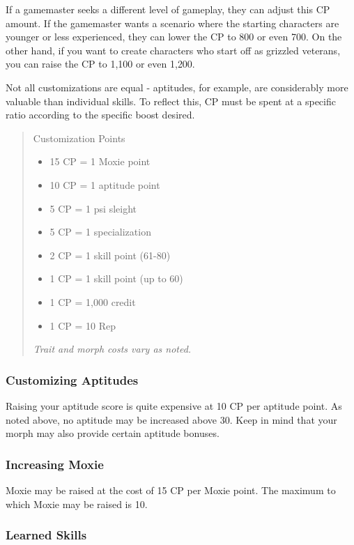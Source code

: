 If a gamemaster seeks a different level of gameplay, they can adjust this CP amount. If the gamemaster wants a scenario where the starting characters are younger or less experienced, they can lower the CP to 800 or even 700. On the other hand, if you want to create characters who start off as grizzled veterans, you can raise the CP to 1,100 or even 1,200.

Not all customizations are equal - aptitudes, for example, are considerably more valuable than individual skills. To reflect this, CP must be spent at a specific ratio according to the specific boost desired.

\begin{quotation}
Customization Points 
\begin{itemize} 
\item 15 CP = 1 Moxie point 
\item 10 CP = 1 aptitude point 
\item 5 CP = 1 psi sleight 
\item 5 CP = 1 specialization 
\item 2 CP = 1 skill point (61-80) 
\item 1 CP = 1 skill point (up to 60) 
\item 1 CP = 1,000 credit 
\item 1 CP = 10 Rep
\end{itemize} \textit{Trait and morph costs vary as noted.}
\end{quotation}

\subsubsection{Customizing Aptitudes}
\label{sec:customizing-aptitudes}

Raising your aptitude score is quite expensive at 10 CP per aptitude point. As noted above, no aptitude may be increased above 30. Keep in mind that your morph may also provide certain aptitude bonuses.

\subsubsection{Increasing Moxie}
\label{sec:increasing-moxie}

Moxie may be raised at the cost of 15 CP per Moxie point. The maximum to which Moxie may be raised is 10. %

\subsubsection{Learned Skills}
\label{sec:buying-learned-skills}

